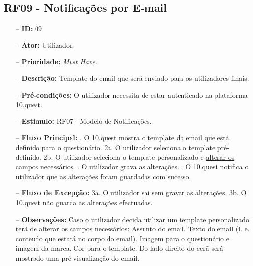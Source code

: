 \subsection{RF09 - Notificações por E-mail}
\begin{itemize}
	\item[--] \textbf{ID:} 09
	\item[--]  \textbf{Ator:} Utilizador.
	\item[--]  \textbf{Prioridade:} \textit{Must Have}.
	\item[--]  \textbf{Descrição:} Template do email que será enviado para os utilizadores finais.
	\item[--]  \textbf{Pré-condições:} O utilizador necessita de estar autenticado na plataforma 10.quest.
	\item[--]  \textbf{Estimulo:} RF07 - Modelo de Notificações.
	\item[--]  \textbf{Fluxo Principal:} 
	. O 10.quest mostra o template do email que está definido para o questionário.
	\subitem 2a. O utilizador seleciona o template pré-definido.
	\subitem 2b. O utilizador seleciona o template personalizado e \underline{alterar os campos necessários}.
	. O utilizador grava as alterações.
	. O 10.quest notifica o utilizador que as alterações foram guardadas com sucesso.
	\item[--]  \textbf{Fluxo de Excepção:} 
	\subitem 3a. O utilizador sai sem gravar as alterações.
	\subitem 3b. O 10.quest não guarda as alterações efectuadas.
	\item[--]  \textbf{Observações:} Caso o utilizador decida utilizar um template personalizado terá de \underline{alterar os campos necessários}:
		\subitem Assunto do email.
		\subitem Texto do email (i. e. conteudo que estará no corpo do email).
		\subitem Imagem para o questionário e imagem da marca.
		\subitem Cor para o template.
	Do lado direito do ecrã será mostrado uma pré-visualização do email.
\end{itemize}
\newpage

